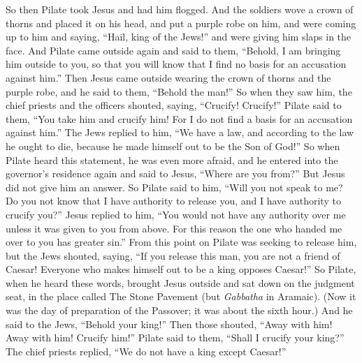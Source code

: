\begin{biblechapter} %
 So then Pilate took Jesus and had him flogged.
\verse And the soldiers wove a crown of thorns and placed it on his head, and put a purple robe on him,
\verse and were coming up to him and saying, “Hail, king of the Jews!” and were giving him slaps in the face.
\verse And Pilate came outside again and said to them, “Behold, I am bringing him outside to you, so that you will know that I find no basis for an accusation against him.”
\verse Then Jesus came outside wearing the crown of thorns and the purple robe, and he said to them, “Behold the man!”
\verse So when they saw him, the chief priests and the officers shouted, saying, “Crucify! Crucify!” Pilate said to them, “You take him and crucify him! For I do not find a basis for an accusation against him.”
\verse The Jews replied to him, “We have a law, and according to the law he ought to die, because he made himself out to be the Son of God!”
\verse So when Pilate heard this statement, he was even more afraid,
\verse and he entered into the governor’s residence again and said to Jesus, “Where are you from?” But Jesus did not give him an answer.
\verse So Pilate said to him, “Will you not speak to me? Do you not know that I have authority to release you, and I have authority to crucify you?”
\verse Jesus replied to him, “You would not have any authority over me unless it was given to you from above. For this reason the one who handed me over to you has greater sin.”
\verse From this point on Pilate was seeking to release him, but the Jews shouted, saying, “If you release this man, you are not a friend of Caesar! Everyone who makes himself out to be a king opposes Caesar!”
\verse So Pilate, when he heard these words, brought Jesus outside and sat down on the judgment seat, in the place called The Stone Pavement (but \textit{Gabbatha} in Aramaic).
\verse (Now it was the day of preparation of the Passover; it was about the sixth hour.) And he said to the Jews, “Behold your king!”
\verse Then those shouted, “Away with him! Away with him! Crucify him!” Pilate said to them, “Shall I crucify your king?” The chief priests replied, “We do not have a king except Caesar!”

\end{biblechapter}
